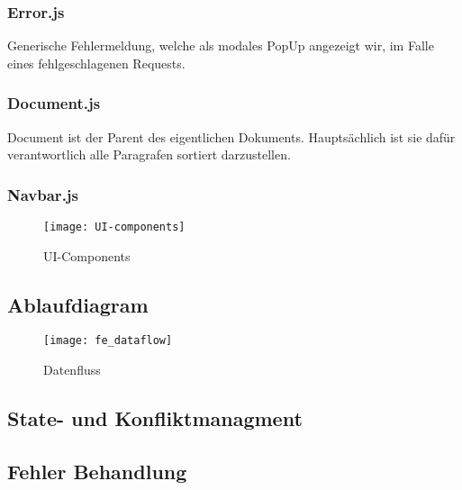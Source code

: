 \subsubsection*{Error.js}
Generische Fehlermeldung, welche als modales PopUp angezeigt wir, im Falle eines fehlgeschlagenen Requests.

\subsubsection*{Document.js}
Document ist der Parent des eigentlichen Dokuments.
Hauptsächlich ist sie dafür verantwortlich alle Paragrafen sortiert darzustellen.

\subsubsection*{Navbar.js}

\begin{figure}[H]
    \centering
    \texttt{[image: UI-components]}
    \caption{UI-Components}
    \label{fig: UI-Components}
\end{figure}

\subsection{Ablaufdiagram}

\begin{figure}[H]
    \texttt{[image: fe\_dataflow]}
    \caption{Datenfluss}
    \label{fig:}
\end{figure}


\subsection{State- und Konfliktmanagment}

\subsection{Fehler Behandlung}
